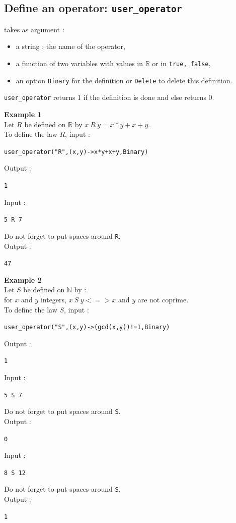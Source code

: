 \documentclass[a4paper,11pt]{book}
\begin{document}
\subsection{Define an operator:  {\tt user\_operator}}
 takes as argument :
\begin{itemize}
\item a string : the name of the operator,
\item a function of two variables with values in $\mathbb R$ or in 
{\tt true, false},
\item an option {\tt Binary} for the definition or {\tt Delete} to delete
this definition.
\end{itemize}
{\tt user\_operator} returns 1 if the definition is done and else returns 0.

{\bf Example 1}\\
Let $R$ be defined on $\mathbb R$ by $x\ R \ y= x*y+x+y$.\\
To define the law $R$, input :
\begin{center}{\tt user\_operator("R",(x,y)->x*y+x+y,Binary)}\end{center}
Output :
\begin{center}{\tt 1}\end{center}  
Input :
\begin{center}{\tt 5 R 7}\end{center}
Do not forget to put spaces around {\tt R}.\\
Output :
\begin{center}{\tt 47}\end{center}
  
{\bf Example 2}\\
Let $S$ be defined on $\mathbb N$ by :\\
for  $x$ and $y$ integers, $x\ S \ y <=> x$ and $y$ are not coprime.\\
To define the law  $S$, input :
\begin{center}{\tt user\_operator("S",(x,y)->(gcd(x,y))!=1,Binary)}\end{center}
Output :
\begin{center}{\tt 1}\end{center}  
Input :
\begin{center}{\tt 5 S 7}\end{center}
Do not forget to put spaces around {\tt S}.\\
Output :
\begin{center}{\tt 0}\end{center}  
Input :
\begin{center}{\tt 8 S 12}\end{center}
Do not forget to put spaces around {\tt S}.\\
Output :
\begin{center}{\tt 1}\end{center}
\end{document}
